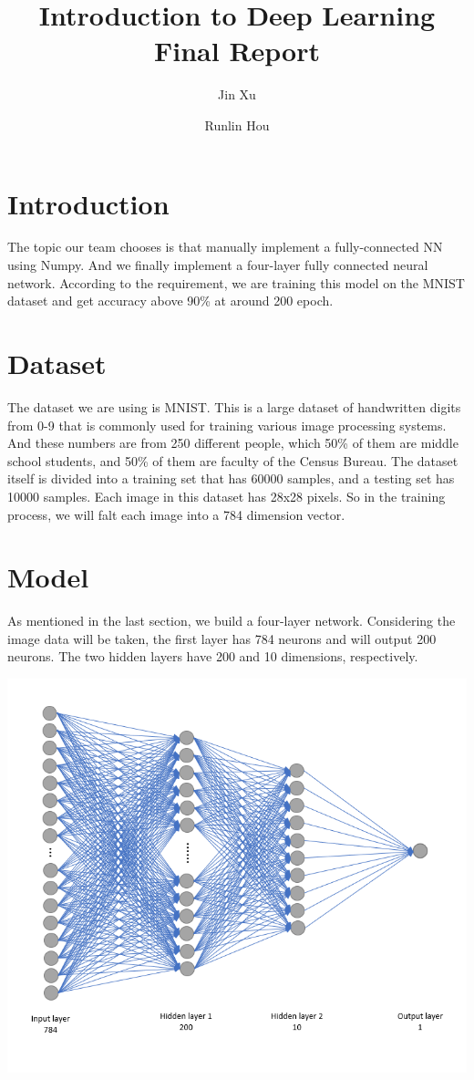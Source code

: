 \documentclass[12pt]{article}
\begin{document}
\title{\textbf{Introduction to Deep Learning Final Report}}
\author{Jin Xu \and Runlin Hou}    
\maketitle


\section{Introduction}
The topic our team chooses is that manually implement a fully-connected NN using Numpy. And 
we finally implement a four-layer fully connected neural network. According to the requirement, 
we are training this model on the MNIST dataset and get accuracy above 90\% at around 200 
epoch.

\section{Dataset}
The dataset we are using is MNIST. This is a large dataset of handwritten digits from 0-9 that 
is commonly used for training various image processing systems. And these numbers are from 250 
different people, which 50\% of them are middle school students, and 50\% of them are faculty 
of the Census Bureau. The dataset itself is divided into a training set that has 60000 samples, 
and a testing set has 10000 samples.  Each image in this dataset has 28x28 pixels. So in the 
training process, we will falt each image into a 784 dimension vector.

\section{Model}
As mentioned in the last section, we build a four-layer network. Considering the image data will be taken, the first layer has 784 neurons and will output 200 neurons. The two hidden layers have 200 and 10 dimensions, respectively.
\begin{center}
    \includegraphics[scale=0.7]{network.png}
\end{center}
\end{document}
